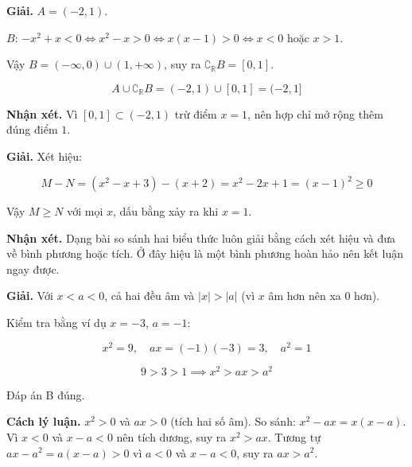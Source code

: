 \documentclass[11pt, a4paper]{article}
\begin{document}
\begin{dapan}[7 — Đáp án A]
\textbf{Giải.} $A = (-2, 1)$.

$B$: $-x^2 + x < 0 \iff x^2 - x > 0 \iff x(x-1) > 0 \iff x < 0$ hoặc $x > 1$.

Vậy $B = (-\infty, 0) \cup (1, +\infty)$, suy ra $\complement_{\mathbb{R}} B = [0, 1]$.

$$A \cup \complement_{\mathbb{R}} B = (-2, 1) \cup [0, 1] = (-2, 1]$$

\textbf{Nhận xét.} Vì $[0,1] \subset (-2,1)$ trừ điểm $x = 1$, nên hợp chỉ mở rộng thêm đúng điểm $1$.
\end{dapan}

\begin{dapan}[8 — Đáp án C]
\textbf{Giải.} Xét hiệu:

$$M - N = (x^2 - x + 3) - (x + 2) = x^2 - 2x + 1 = (x-1)^2 \ge 0$$

Vậy $M \ge N$ với mọi $x$, dấu bằng xảy ra khi $x = 1$.

\textbf{Nhận xét.} Dạng bài so sánh hai biểu thức luôn giải bằng cách xét hiệu và đưa về bình phương hoặc tích. Ở đây hiệu là một bình phương hoàn hảo nên kết luận ngay được.
\end{dapan}

\begin{dapan}[9 — Đáp án B]
\textbf{Giải.} Với $x < a < 0$, cả hai đều âm và $|x| > |a|$ (vì $x$ âm hơn nên xa $0$ hơn).

Kiểm tra bằng ví dụ $x = -3$, $a = -1$:

$$x^2 = 9, \quad ax = (-1)(-3) = 3, \quad a^2 = 1$$

$$9 > 3 > 1 \implies x^2 > ax > a^2$$

Đáp án B đúng.

\textbf{Cách lý luận.} $x^2 > 0$ và $ax > 0$ (tích hai số âm). So sánh: $x^2 - ax = x(x-a)$. Vì $x < 0$ và $x - a < 0$ nên tích dương, suy ra $x^2 > ax$. Tương tự $ax - a^2 = a(x-a) > 0$ vì $a<0$ và $x-a<0$, suy ra $ax > a^2$.
\end{dapan}
\end{document}
